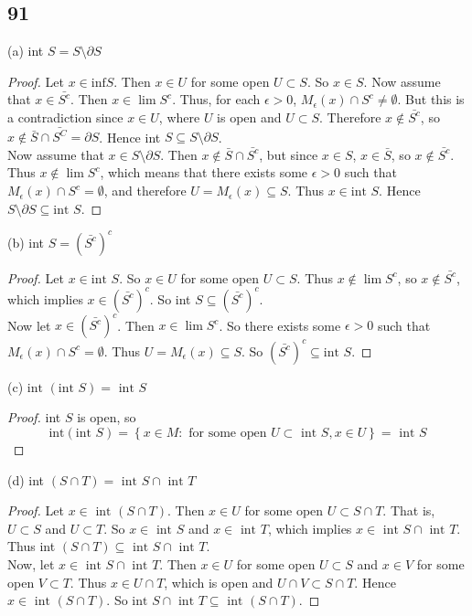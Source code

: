\documentclass[11pt]{amsart}
\begin{document}
\subsection*{91} (a) int $S = S \setminus \partial S$
\begin{proof}
  Let $x\in \text{inf} S$. Then $x \in U$ for some open $U \subset S$. So $x \in S$. Now assume that $x \in \bar{S^{c}}$. Then $x\in \lim S^{c}$. Thus, for each $\epsilon > 0$, $M_{\epsilon}(x) \cap S^{c} \neq \emptyset$. But this is a contradiction since $x\in U$, where $U$ is open and $U \subset S$. Therefore $x\notin \bar{S^{c}}$, so $x\notin \bar{S}\cap \bar{S^{C}} = \partial S$. Hence int $S \subseteq S\setminus \partial S$. \\
  Now assume that $x\in S\setminus \partial S$. Then $x\notin \bar{S}\cap \bar{S^{c}}$, but since $x\in S$, $x \in \bar{S}$, so $x\notin \bar{S^{c}}$. Thus $x\notin \lim S^{c}$, which means that there exists some $\epsilon > 0$ such that $M_{\epsilon}(x) \cap S^{c} = \emptyset$, and therefore $U = M_{\epsilon}(x) \subseteq S$. Thus $x\in \text{int } S$. Hence $S\setminus \partial S \subseteq \text{int } S$.
\end{proof}

(b) int $S = (\bar{S^{c}})^{c}$
\begin{proof}
  Let $x\in \text{int } S$. So $x \in U$ for some open $U\subset S$. Thus $x\notin \lim S^{c}$, so $x\notin \bar{S^{c}}$, which implies $x\in (\bar{S^{c}})^{c}$. So int $S \subseteq (\bar{S^{c}})^{c}$. \\
  Now let $x \in (\bar{S^{c}})^{c}$. Then $x\in \lim S^{c}$. So there exists some $\epsilon > 0$ such that $M_{\epsilon}(x) \cap S^{c} = \emptyset$. Thus $U = M_{\epsilon}(x) \subseteq S$. So $(\bar{S^{c}})^{c} \subseteq \text{int } S$.
\end{proof}

(c) $\text{int }(\text{int }S) = \text{ int }S$
\begin{proof}
  int $S$ is open, so 
  \[ \text{int} (\text{int }S) = \left\{ x \in M : \text{ for some open } U \subset \text{ int } S, x \in U\right\}  = \text{ int } S \]
\end{proof}

(d) int $(S\cap T) = \text{ int } S \cap \text{ int } T$
\begin{proof}
  Let $x\in \text{ int }(S\cap T)$. Then $x\in U$ for some open $U \subset S\cap T$. That is, $U\subset S$ and $U\subset T$. So $x\in \text{ int }S$ and $x\in \text{ int }T$, which implies $x\in \text{ int } S \cap \text{ int }T$. Thus int $(S\cap T) \subseteq \text{ int }S \cap \text{ int }T$. \\
  Now, let $x \in \text{ int } S \cap \text{ int }T$. Then $x\in U$ for some open $U \subset S$ and $x\in V$ for some open $V\subset T$. Thus $x\in U\cap T$, which is open and $U\cap V \subset S\cap T$. Hence $x \in \text{ int }(S\cap T)$. So $\text{int } S\cap \text{ int }T \subseteq \text{ int }(S\cap T)$.
\end{proof}
\end{document}
